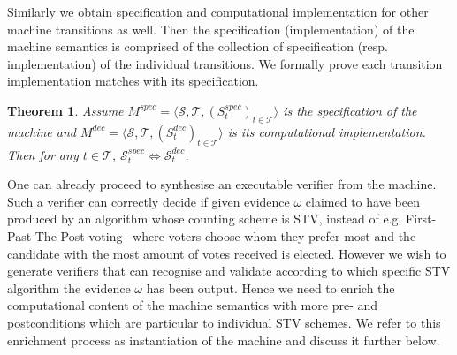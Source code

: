 \documentclass[10pt,conference]{IEEEtran}
\newtheorem{theorem}{Theorem}
\begin{document}
Similarly  
we obtain specification and computational implementation for other machine transitions as well. Then the specification (implementation) of the machine semantics is comprised of the collection of specification (resp. implementation) of the individual transitions. We formally prove 
each transition implementation  matches with its specification.
\begin{theorem}
Assume $M^{spec} = \langle \mathcal{S}, \mathcal{T}, (S_{t}^{spec})_{t \in \mathcal{T}} \rangle$ is the specification of the machine and  $M^{dec} = \langle \mathcal{S}, \mathcal{T}, (S_{t}^{dec})_{t \in \mathcal{T}} \rangle$ is its computational implementation. Then for any $t\in\mathcal{T}$,  $\mathcal{S}_{t}^{spec}\Leftrightarrow\mathcal{S}_{t}^{dec}$.      
\end{theorem}

One can already proceed to synthesise an executable verifier from the machine. Such a verifier can correctly decide if given evidence $\omega$ claimed to have been produced by an algorithm whose counting scheme is STV, instead of e.g. First-Past-The-Post voting~\cite{DFar} where voters choose whom they prefer most and the candidate with the most amount of votes received is elected.  
However we wish to generate verifiers that can recognise and validate according to which specific STV algorithm the evidence $\omega$ has been output. Hence we need to enrich the computational content of the machine semantics with more  pre- and postconditions which are particular to individual STV schemes. We refer to this enrichment process as instantiation of the machine and discuss it further below.
\end{document}
